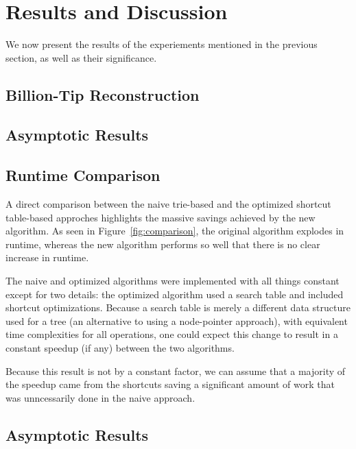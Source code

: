 \section{Results and Discussion} \label{sec:results}

We now present the results of the experiements mentioned in the previous section, as well as their significance.

\subsection{Billion-Tip Reconstruction}



\subsection{Asymptotic Results}



\subsection{Runtime Comparison}

A direct comparison between the naive trie-based and the optimized shortcut table-based approches highlights the massive savings achieved by the new algorithm. As seen in Figure~\ref{fig:comparison}, the original algorithm explodes in runtime, whereas the new algorithm performs so well that there is no clear increase in runtime.



The naive and optimized algorithms were implemented with all things constant except for two details: the optimized algorithm used a search table and included shortcut optimizations. Because a search table is merely a different data structure used for a tree (an alternative to using a node-pointer approach), with equivalent time complexities for all operations, one could expect this change to result in a constant speedup (if any) between the two algorithms.

Because this result is not by a constant factor, we can assume that a majority of the speedup came from the shortcuts saving a significant amount of work that was unncessarily done in the naive approach. 

\subsection{Asymptotic Results} \label{sec:results:asymptotic}


